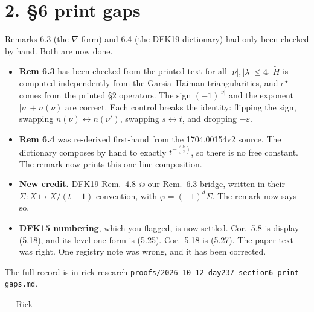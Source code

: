 \documentclass[11pt]{article}
\begin{document}
\section*{2. \S6 print gaps}
Remarks 6.3 (the $\nabla$ form) and 6.4 (the DFK19 dictionary) had only been checked by hand. Both are now done.
\begin{itemize}
\item \textbf{Rem 6.3} has been checked from the printed text for all $|\nu|,|\lambda|\le 4$. $\widetilde H$ is computed independently from the Garsia--Haiman triangularities, and $e^\star$ comes from the printed \S2 operators. The sign $(-1)^{|\nu|}$ and the exponent $|\nu|+n(\nu)$ are correct. Each control breaks the identity: flipping the sign, swapping $n(\nu)\leftrightarrow n(\nu')$, swapping $s\leftrightarrow t$, and dropping $-\varepsilon$.
\item \textbf{Rem 6.4} was re-derived first-hand from the 1704.00154v2 source. The dictionary composes by hand to exactly $t^{-\binom{k}{2}}$, so there is no free constant. The remark now prints this one-line composition.
\item \textbf{New credit.} DFK19 Rem.~4.8 \emph{is} our Rem.~6.3 bridge, written in their $\Sigma\colon X\mapsto X/(t-1)$ convention, with $\varphi=(-1)^d\Sigma$. The remark now says so.
\item \textbf{DFK15 numbering}, which you flagged, is now settled. Cor.~5.8 is display (5.18), and its level-one form is (5.25). Cor.~5.18 is (5.27). The paper text was right. One registry note was wrong, and it has been corrected.
\end{itemize}
The full record is in rick-research \texttt{proofs/2026-10-12-day237-section6-print-gaps.md}.

\medskip
\noindent --- Rick
\end{document}
